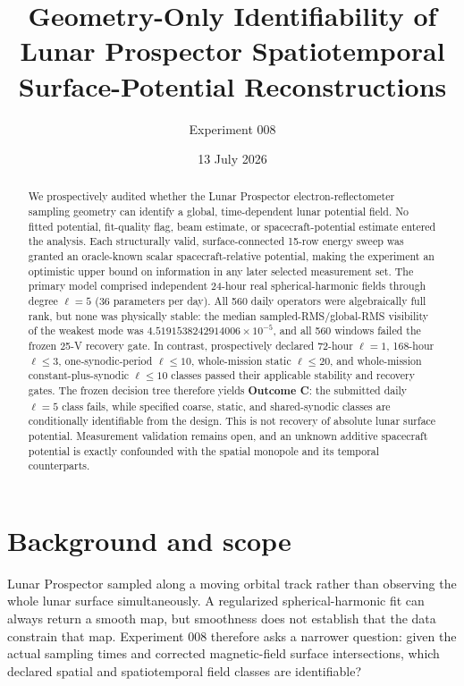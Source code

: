 \documentclass[11pt]{article}
\title{Geometry-Only Identifiability of Lunar Prospector\newline
Spatiotemporal Surface-Potential Reconstructions}
\author{Experiment 008}
\date{13 July 2026}
\begin{document}
\maketitle

\begin{abstract}
We prospectively audited whether the Lunar Prospector electron-reflectometer
sampling geometry can identify a global, time-dependent lunar potential field.
No fitted potential, fit-quality flag, beam estimate, or spacecraft-potential
estimate entered the analysis.  Each structurally valid, surface-connected
15-row energy sweep was granted an oracle-known scalar spacecraft-relative
potential, making the experiment an optimistic upper bound on information in
any later selected measurement set.  The primary model comprised independent
24-hour real spherical-harmonic fields through degree $\ell=5$ (36 parameters
per day).  All 560 daily operators were algebraically full rank, but none was
physically stable: the median sampled-RMS/global-RMS visibility of the weakest
mode was $4.5191538242914006\times10^{-5}$, and all 560 windows failed the
frozen 25-V recovery gate.  In contrast, prospectively declared 72-hour
$\ell=1$, 168-hour $\ell\leq3$, one-synodic-period $\ell\leq10$, whole-mission
static $\ell\leq20$, and whole-mission constant-plus-synodic $\ell\leq10$
classes passed their applicable stability and recovery gates.  The frozen
decision tree therefore yields \textbf{Outcome C}: the submitted daily
$\ell=5$ class fails, while specified coarse, static, and shared-synodic
classes are conditionally identifiable from the design.  This is not recovery
of absolute lunar surface potential.  Measurement validation remains open,
and an unknown additive spacecraft potential is exactly confounded with the
spatial monopole and its temporal counterparts.
\end{abstract}

\section{Background and scope}

Lunar Prospector sampled along a moving orbital track rather than observing the
whole lunar surface simultaneously.  A regularized spherical-harmonic fit can
always return a smooth map, but smoothness does not establish that the data
constrain that map.  Experiment 008 therefore asks a narrower question: given
the actual sampling times and corrected magnetic-field surface intersections,
which declared spatial and spatiotemporal field classes are identifiable?
\end{document}
